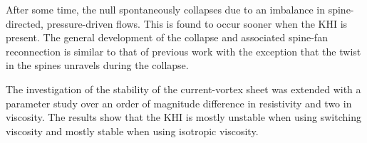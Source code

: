 After some time, the null spontaneously collapses due to an imbalance in spine-directed, pressure-driven flows. This is found to occur sooner when the KHI is present. The general development of the collapse and associated spine-fan reconnection is similar to that of previous work with the exception that the twist in the spines unravels during the collapse.

The investigation of the stability of the current-vortex sheet was extended with a parameter study over an order of magnitude difference in resistivity and two in viscosity. The results show that the KHI is mostly unstable when using switching viscosity and mostly stable when using isotropic viscosity.
